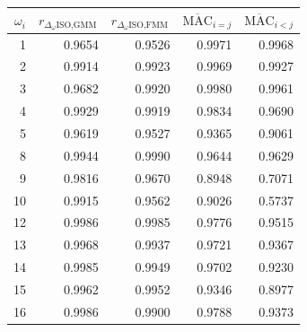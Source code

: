 \begin{tabular}{rrrrr}
    \hline
    $\omega_i$ & $r_{\Delta_{\omega}{\text{ISO},\text{GMM}}}$ & $r_{\Delta_{\omega}{\text{ISO},\text{FMM}}}$ & $\overline{\mathrm{MAC}}_{i=j}$ & $\overline{\mathrm{MAC}}_{i<j}$ \\
    \hline
    1          & 0.9654                                       & 0.9526                                       & 0.9971                          & 0.9968                          \\
    2          & 0.9914                                       & 0.9923                                       & 0.9969                          & 0.9927                          \\
    3          & 0.9682                                       & 0.9920                                       & 0.9980                          & 0.9961                          \\
    4          & 0.9929                                       & 0.9919                                       & 0.9834                          & 0.9690                          \\
    5          & 0.9619                                       & 0.9527                                       & 0.9365                          & 0.9061                          \\
    8          & 0.9944                                       & 0.9990                                       & 0.9644                          & 0.9629                          \\
    9          & 0.9816                                       & 0.9670                                       & 0.8948                          & 0.7071                          \\
    10         & 0.9915                                       & 0.9562                                       & 0.9026                          & 0.5737                          \\
    12         & 0.9986                                       & 0.9985                                       & 0.9776                          & 0.9515                          \\
    13         & 0.9968                                       & 0.9937                                       & 0.9721                          & 0.9367                          \\
    14         & 0.9985                                       & 0.9949                                       & 0.9702                          & 0.9230                          \\
    15         & 0.9962                                       & 0.9952                                       & 0.9346                          & 0.8977                          \\
    16         & 0.9986                                       & 0.9900                                       & 0.9788                          & 0.9373                          \\
    \hline
\end{tabular}
